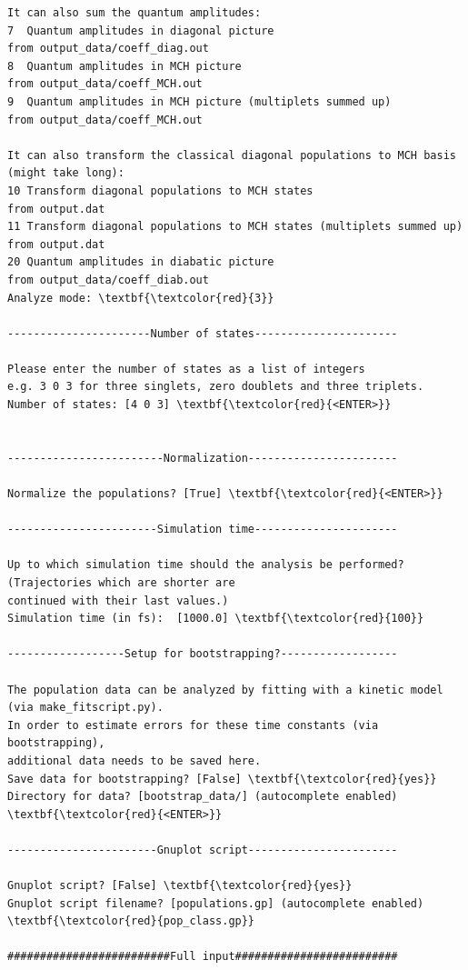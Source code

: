 \documentclass[a4paper,11pt,DIV=15,openany]{scrbook}
\begin{document}
\begin{oframed}
\begin{Verbatim}[commandchars=\\\{\}]
It can also sum the quantum amplitudes:
7  Quantum amplitudes in diagonal picture                                     from output_data/coeff_diag.out
8  Quantum amplitudes in MCH picture                                          from output_data/coeff_MCH.out
9  Quantum amplitudes in MCH picture (multiplets summed up)                   from output_data/coeff_MCH.out

It can also transform the classical diagonal populations to MCH basis (might take long):
10 Transform diagonal populations to MCH states                               from output.dat
11 Transform diagonal populations to MCH states (multiplets summed up)        from output.dat
20 Quantum amplitudes in diabatic picture                                     from output_data/coeff_diab.out
Analyze mode: \textbf{\textcolor{red}{3}}

----------------------Number of states----------------------

Please enter the number of states as a list of integers
e.g. 3 0 3 for three singlets, zero doublets and three triplets.
Number of states: [4 0 3] \textbf{\textcolor{red}{<ENTER>}}


------------------------Normalization-----------------------

Normalize the populations? [True] \textbf{\textcolor{red}{<ENTER>}}

-----------------------Simulation time----------------------

Up to which simulation time should the analysis be performed? (Trajectories which are shorter are 
continued with their last values.)
Simulation time (in fs):  [1000.0] \textbf{\textcolor{red}{100}}

------------------Setup for bootstrapping?------------------

The population data can be analyzed by fitting with a kinetic model (via make_fitscript.py). 
In order to estimate errors for these time constants (via bootstrapping), 
additional data needs to be saved here.
Save data for bootstrapping? [False] \textbf{\textcolor{red}{yes}}
Directory for data? [bootstrap_data/] (autocomplete enabled) \textbf{\textcolor{red}{<ENTER>}}

-----------------------Gnuplot script-----------------------

Gnuplot script? [False] \textbf{\textcolor{red}{yes}}
Gnuplot script filename? [populations.gp] (autocomplete enabled) \textbf{\textcolor{red}{pop_class.gp}}

#########################Full input#########################


\end{Verbatim}
\end{oframed}
\end{document}
